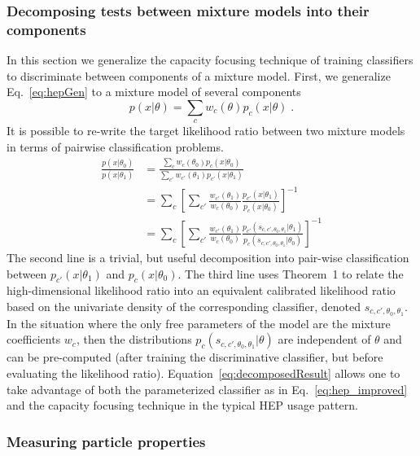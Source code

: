 \documentclass[12pt]{article}
\numberwithin{equation}{section}
\theoremstyle{plain}
\begin{document}
\subsubsection{Decomposing tests between mixture models into their components}

In this section we generalize the capacity focusing technique of training
classifiers to discriminate between components of a mixture model. First, we
generalize Eq.~\ref{eq:hepGen} to a mixture model of several components
\begin{equation}
p(x|\theta)=\sum_c w_c(\theta) p_c(x| \theta) \;.
\end{equation}
It is possible to re-write the target likelihood ratio between two mixture models in terms of pairwise classification problems.
\begin{align}
\frac{p(x|\theta_0)}{p(x|\theta_1)} &= \frac{\sum_c w_c(\theta_0) p_c(x| \theta_0)}{\sum_{c'} w_{c'}(\theta_1) p_{c'}(x| \theta_1)} \nonumber \\
&= \sum_c \left[ \sum_{c'} \frac{ w_{c'}(\theta_1)}{w_c(\theta_0)} \frac{ p_{c'}(x| \theta_1)}{  p_c(x| \theta_0)}  \right]^{-1} \nonumber \\
&= \sum_c \left[ \sum_{c'} \frac{ w_{c'}(\theta_1)}{w_c(\theta_0)} \frac{ p_{c'}(s_{c,c',\theta_0, \theta_1}| \theta_1)}{ p_c(s_{c,c',\theta_0, \theta_1}| \theta_0)}  \right]^{-1} \label{eq:decomposedResult}
\end{align}
The second line is a trivial, but useful decomposition into pair-wise classification between $p_{c'}(x|\theta_1)$ and $p_c(x|\theta_0)$.  The third line uses Theorem~1 to relate the high-dimensional likelihood ratio into an equivalent calibrated likelihood ratio based on the univariate density of the corresponding classifier, denoted $s_{c,c',\theta_0, \theta_1}$. In the situation where the only free parameters of the  model are the mixture coefficients $w_c$, then the distributions $p_{c}(s_{c,c',\theta_0, \theta_1}| \theta)$ are independent of $\theta$ and can be pre-computed (after training the discriminative classifier, but before evaluating the  likelihood ratio). Equation~\ref{eq:decomposedResult} allows one to take advantage of both the parameterized classifier as in Eq.~\ref{eq:hep_improved} and the capacity focusing technique in the typical HEP usage pattern.

\subsubsection{Measuring particle properties}
\end{document}
